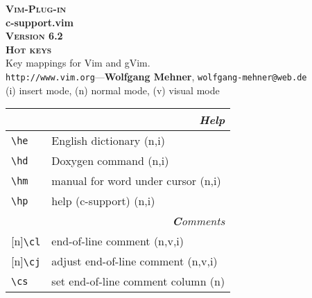 \documentclass[oneside,11pt,landscape,DIV16]{scrartcl}
\newcommand{\Pluginversion}{6.2}
\newcommand{\Rep}{{\tiny{[n]}}}
\begin{document}
%
%
\begin{multicols}{3}
\begin{center}
%
\textbf{\textsc{\small{Vim-Plug-in}}}\\
\textbf{\LARGE{c-support.vim}}\\
\textbf{\textsc{\small{Version \Pluginversion}}}\\
\vspace{1mm}%
\textbf{\textsc{\Huge{Hot keys}}}\\ 
\vspace{1mm}%
Key mappings for Vim and gVim.\\
{\tiny  \texttt{http://www.vim.org}\hspace{1.5mm}---\hspace{1.5mm}\textbf{Wolfgang Mehner},  \texttt{wolfgang-mehner@web.de}}\\
\vspace{1.0mm}
{\normalsize (i)} insert mode, {\normalsize (n)} normal mode, {\normalsize (v)} visual mode\\
\vspace{1.0mm}
%
\begin{tabular}[]{|p{10mm}|p{60mm}|}
\hline 
\multicolumn{2}{|r|}{\textsl{\textbf{H}elp}}\\
\hline \verb'\he'   & English dictionary \hfill (n,i)\\
\hline \verb'\hd'   & Doxygen command \hfill (n,i)\\
\hline \verb'\hm'   & manual for word under cursor  \hfill (n,i)\\
\hline \verb'\hp'   & help (c-support) \hfill (n,i)\\
\hline 
%
\hline
\multicolumn{2}{|r|}{\textsl{\textbf{C}omments}} \\
\hline \Rep\verb'\cl'  & end-of-line comment                     \hfill (n,v,i)\\
\hline \Rep\verb'\cj'  & adjust end-of-line comment              \hfill (n,v,i)\\
\hline     \verb'\cs'  & set end-of-line comment column          \hfill (n)    \\

\end{tabular}
\end{center}
\end{multicols}
\end{document}
